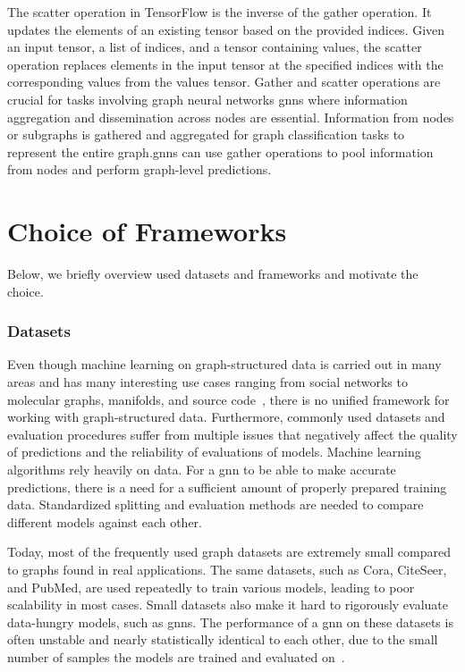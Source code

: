 The scatter operation in TensorFlow is the inverse of the gather operation. It updates the elements of an existing tensor based on the provided indices. Given an input tensor, a list of indices, and a tensor containing values, the scatter operation replaces elements in the input tensor at the specified indices with the corresponding values from the values tensor.
Gather and scatter operations are crucial for tasks involving graph neural networks \acp{gnn} where information aggregation and dissemination across nodes are essential. Information from nodes or subgraphs is gathered and aggregated for graph classification tasks to represent the entire graph.\acp{gnn} can use gather operations to pool information from nodes and perform graph-level predictions.

\section{Choice of Frameworks}
\label{sec:implement:setup: frameworks}
Below, we briefly overview used datasets and frameworks and motivate the choice.
\subsubsection{Datasets}
\label{sec:implement:setup:frameworks: choice}
Even though machine learning on graph-structured data is carried out in many areas and has many interesting use cases ranging from social networks to molecular graphs, manifolds, and source code~\cite{Hu2020},
there is no unified framework for working with graph-structured data. Furthermore, commonly used datasets and evaluation procedures suffer from multiple issues that negatively affect the quality of predictions and the reliability of evaluations of models.
Machine learning algorithms rely heavily on data. For a \ac{gnn} to be able to make accurate predictions, there is a need for a sufficient amount of properly prepared training data. Standardized splitting and evaluation methods are needed to compare different models against each other.

Today, most of the frequently used graph datasets are extremely small compared to graphs found in real applications. The same datasets, such as Cora, CiteSeer, and PubMed, are used repeatedly to train various models, leading to poor scalability in most cases. Small datasets also make it hard to rigorously evaluate data-hungry models, such as \acfp{gnn}. The performance of a \ac{gnn} on these datasets is often unstable and nearly statistically identical to each other, due to the small number of samples the models are trained and evaluated on~\cite{Kipf2017,Xu2019, Hu2020}.

